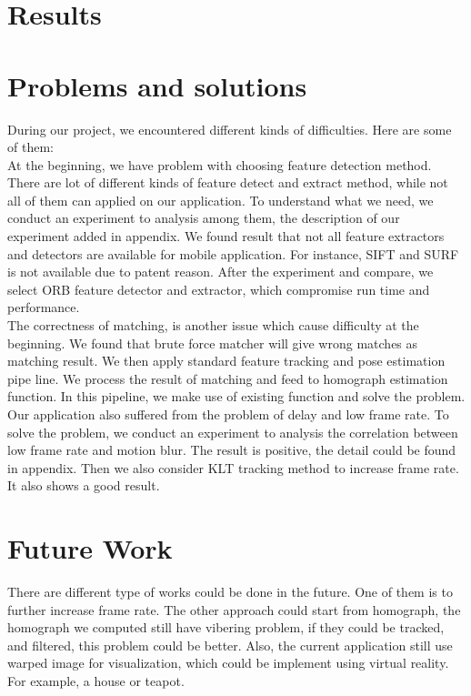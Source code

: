 \documentclass[10pt,conference,compsocconf]{IEEEtran}
\begin{document}
\section{Results}

\section{Problems and solutions}
During our project, we encountered different kinds of difficulties. Here are some of them:\\
At the beginning, we have problem with choosing feature detection method. There are lot of different kinds of feature detect and extract method, while not all of them can applied on our application. To understand what we need, we conduct an experiment to analysis among them, the description of our experiment added in appendix. We found result that not all feature extractors and detectors are available for mobile application. For instance, SIFT and SURF is not available due to patent reason. After the experiment and compare, we select ORB feature detector and extractor, which compromise run time and performance.\\

The correctness of matching, is another issue which cause difficulty at the beginning. We found that brute force matcher will give wrong matches as matching result. We then apply standard feature tracking and pose estimation pipe line. We process the result of matching and feed to homograph estimation function. In this pipeline, we make use of existing function and solve the problem.\\

Our application also suffered from the problem of delay and low frame rate. To solve the problem, we conduct an experiment to analysis the correlation between low frame rate and motion blur. The result is positive, the detail could be found in appendix. Then we also consider KLT tracking method to increase frame rate. It also shows a good result.\\

\section{Future Work}
There are different type of works could be done in the future. One of them is to further increase frame rate. The other approach could start from homograph, the homograph we computed still have vibering problem, if they could be tracked, and filtered, this problem could be better. Also, the current application still use warped image for visualization, which could be implement using virtual reality. For example, a house or teapot.
\end{document}
